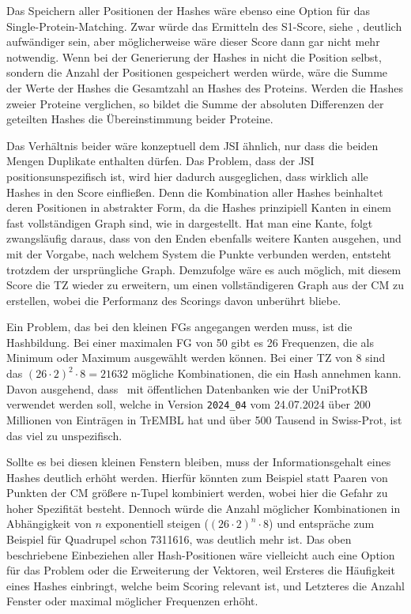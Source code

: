         Das Speichern aller Positionen der Hashes wäre ebenso eine Option für das Single-Protein-Matching. Zwar würde das Ermitteln des S1-Score, siehe , deutlich aufwändiger sein, aber möglicherweise wäre dieser Score dann gar nicht mehr notwendig. Wenn bei der Generierung der Hashes in  nicht die Position selbst, sondern die Anzahl der Positionen gespeichert werden würde, wäre die Summe der Werte der Hashes die Gesamtzahl an Hashes des Proteins. Werden die Hashes zweier Proteine verglichen, so bildet die Summe der absoluten Differenzen der geteilten Hashes die Übereinstimmung beider Proteine.

        Das Verhältnis beider wäre konzeptuell dem \ac{JSI} ähnlich, nur dass die beiden Mengen Duplikate enthalten dürfen. Das Problem, dass der \ac{JSI} positionsunspezifisch ist, wird hier dadurch ausgeglichen, dass wirklich alle Hashes in den Score einfließen. Denn die Kombination aller Hashes beinhaltet deren Positionen in abstrakter Form, da die Hashes prinzipiell Kanten in einem fast vollständigen Graph sind, wie in  dargestellt. Hat man eine Kante, folgt zwangsläufig daraus, dass von den Enden ebenfalls weitere Kanten ausgehen, und mit der Vorgabe, nach welchem System die Punkte verbunden werden, entsteht trotzdem der ursprüngliche Graph. Demzufolge wäre es auch möglich, mit diesem Score die \ac{TZ} wieder zu erweitern, um einen vollständigeren Graph aus der \acf{CM} zu erstellen, wobei die Performanz des Scorings davon unberührt bliebe.

        Ein Problem, das bei den kleinen \acp{FG} angegangen werden muss, ist die Hashbildung. Bei einer maximalen \ac{FG} von 50 gibt es 26 Frequenzen, die als Minimum oder Maximum ausgewählt werden können. Bei einer \ac{TZ} von 8 sind das ${(26 \cdot 2)}^{2} \cdot 8 = 21632$ mögliche Kombinationen, die ein Hash annehmen kann. Davon ausgehend, dass \protfin\ mit öffentlichen Datenbanken wie der UniProtKB \autocite{uniprot} verwendet werden soll, welche in Version \texttt{2024\_04} vom 24.07.2024 über 200 Millionen von Einträgen in TrEMBL hat und über 500 Tausend in Swiss-Prot, ist das viel zu unspezifisch.

        Sollte es bei diesen kleinen Fenstern bleiben, muss der Informationsgehalt \autocite{shannon} eines Hashes deutlich erhöht werden. Hierfür könnten zum Beispiel statt Paaren von Punkten der \ac{CM} größere n-Tupel kombiniert werden, wobei hier die Gefahr zu hoher Spezifität besteht. Dennoch würde die Anzahl möglicher Kombinationen in Abhängigkeit von $n$ exponentiell steigen ($(26 \cdot 2)^{n}\cdot 8$) und entspräche zum Beispiel für Quadrupel schon 7311616, was deutlich mehr ist. Das oben beschriebene Einbeziehen aller Hash-Positionen wäre vielleicht auch eine Option für das Problem oder die Erweiterung der Vektoren, weil Ersteres die Häufigkeit eines Hashes einbringt, welche beim Scoring relevant ist, und Letzteres die Anzahl Fenster oder maximal möglicher Frequenzen erhöht.

